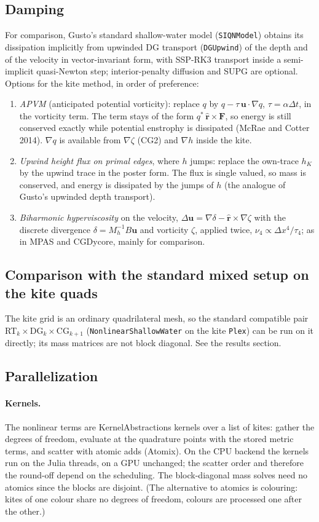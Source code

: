 \documentclass[11pt,a4paper]{article}
\newcommand{\bu}{\mathbf{u}}
\newcommand{\bF}{\mathbf{F}}
\newcommand{\rhat}{\hat{\mathbf{r}}}
\newcommand{\code}[1]{\texttt{#1}}
\begin{document}
\subsection{Damping}
For comparison, Gusto's standard shallow-water model (\code{SIQNModel}) obtains
its dissipation implicitly from upwinded DG transport (\code{DGUpwind}) of the
depth and of the velocity in vector-invariant form, with SSP-RK3 transport inside
a semi-implicit quasi-Newton step; interior-penalty diffusion and SUPG are
optional. Options for the kite method, in order of preference:
\begin{enumerate}
\item \emph{APVM} (anticipated potential vorticity): replace $q$ by
  $q - \tau\,\bu\cdot\nabla q$, $\tau = \alpha\Delta t$, in the vorticity term.
  The term stays of the form $q^*\,\rhat\times\bF$, so energy is still conserved
  exactly while potential enstrophy is dissipated (McRae and Cotter 2014).
  $\nabla q$ is available from $\nabla\zeta$ (CG2) and $\nabla h$ inside the kite.
\item \emph{Upwind height flux on primal edges}, where $h$ jumps: replace the
  own-trace $h_K$ by the upwind trace in the poster form. The flux is single
  valued, so mass is conserved, and energy is dissipated by the jumps of $h$
  (the analogue of Gusto's upwinded depth transport).
\item \emph{Biharmonic hyperviscosity} on the velocity,
  $\Delta\bu = \nabla\delta - \rhat\times\nabla\zeta$ with the discrete
  divergence $\delta = M_h^{-1}B\bu$ and vorticity $\zeta$, applied twice,
  $\nu_4\propto\Delta x^4/\tau_4$; as in MPAS and CGDycore, mainly for comparison.
\end{enumerate}

\subsection{Comparison with the standard mixed setup on the kite quads}
The kite grid is an ordinary quadrilateral mesh, so the standard compatible pair
RT$_k\times$DG$_k\times$CG$_{k+1}$ (\code{NonlinearShallowWater} on the kite
\code{Plex}) can be run on it directly; its mass matrices are not block
diagonal. See the results section.

\subsection{Parallelization}
\paragraph{Kernels.} The nonlinear terms are KernelAbstractions kernels over a
list of kites: gather the degrees of freedom, evaluate at the quadrature points
with the stored metric terms, and scatter with atomic adds (Atomix). On the CPU
backend the kernels run on the Julia threads, on a GPU unchanged; the scatter
order and therefore the round-off depend on the scheduling. The block-diagonal
mass solves need no atomics since the blocks are disjoint. (The alternative to
atomics is colouring: kites of one colour share no degrees of freedom, colours
are processed one after the other.)
\end{document}
